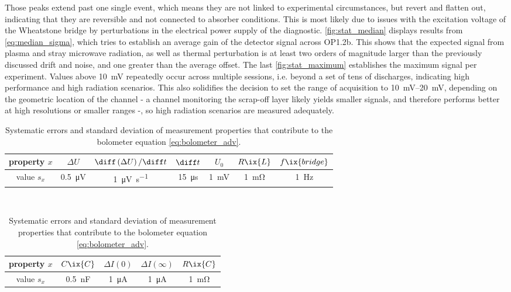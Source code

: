             Those peaks extend past one single event, which means they are not linked to experimental circumstances, but revert and flatten out, indicating that they are reversible and not connected to absorber conditions. This is most likely due to issues with the excitation voltage of the Wheatstone bridge by perturbations in the electrical power supply of the diagnostic. \autoref{fig:stat_median} displays results from \cref{eq:median_sigma}, which tries to establish an average gain of the detector signal across OP1.2b. This shows that the expected signal from plasma and stray microwave radiation, as well as thermal perturbation is at least two orders of magnitude larger than the previously discussed drift and noise, and one greater than the average offset. The last \cref{fig:stat_maximum} establishes the maximum signal per experiment. Values above \SI{10}{\milli\volt} repeatedly occur across multiple sessions, i.e. beyond a set of tens of discharges, indicating high performance and high radiation scenarios. This also solidifies the decision to set the range of acquisition to \SIrange{10}{20}{\milli\volt}, depending on the geometric location of the channel - a channel monitoring the scrap-off layer likely yields smaller signals, and therefore performs better at high resolutions or smaller ranges -, so high radiation scenarios are measured adequately.\\%
%
            \begin{table}[t]%
                \centering%
                \begin{tabular}{||c|c|c|c|c|c|c||}%
                    \hline\rule{0pt}{.75\normalbaselineskip}%
                    property $x$ & $\Delta U$ & $\diff \left(\Delta U\right)/\diff t$ & $\diff t$ & $U_{0}$ & $R\ix{L}$ & $f\ix{bridge}$ \\[.5ex]\hline\hline%
                    value $s_{x}$ & \SI{0.5}{\micro\volt} & \SI{1}{\micro\volt\per\second} & \SI{15}{\micro\second} & \SI{1}{\milli\volt} & \SI{1}{\milli\ohm} & \SI{1}{\hertz} \\[.5ex]\hline%
                \end{tabular}%
                \\[1ex]%
                \begin{tabular}{||c|c|c|c|c||}%
                    \hline\rule{0pt}{.75\normalbaselineskip}%
                    property $x$ & $C\ix{C}$ & $\Delta I\left(0\right)$ & $\Delta I\left(\infty\right)$ & $R\ix{C}$ \\[.5ex]\hline\hline%
                    value $s_{x}$ & \SI{0.5}{\nano\farad} & \SI{1}{\micro\ampere} & \SI{1}{\micro\ampere} & \SI{1}{\milli\ohm} \\[.5ex]\hline%
                \end{tabular}%
                \vspace*{0.5cm}%
                \caption{Systematic errors and standard deviation of measurement properties that contribute to the bolometer equation \cref{eq:bolometer_adv}.}\label{tab:gauss}%
            \end{table}%
